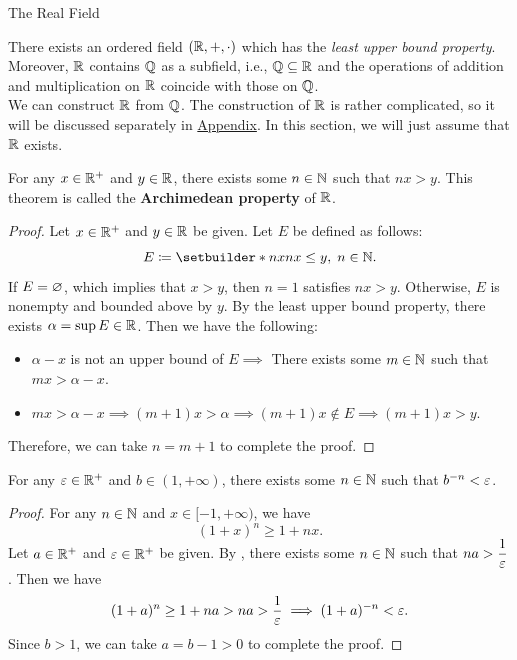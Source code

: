 \begin{section}{The Real Field}

There exists an ordered field $(\mathbb{R}, +, \cdot)$ which has the
\emph{least upper bound property}. Moreover, $\mathbb{R}$ contains $\mathbb{Q}$ as a subfield, i.e.,
$\mathbb{Q} \subseteq \mathbb{R}$ and the operations of addition and multiplication on $\mathbb{R}$ coincide with those on $\mathbb{Q}$.
\\[6mm]
We can construct $\mathbb{R}$ from $\mathbb{Q}$. The construction of $\mathbb{R}$ is rather complicated, so it will be discussed
separately in \hyperref[chap:ConstructionOfR]{Appendix}. In this section, we will just assume that $\mathbb{R}$ exists.

\bigskip

\begin{theorem} \label{thm:ArchimedeanProperty}
    For any $x\in \mathbb{R}^{+}$ and $y \in \mathbb{R}$, there exists some $n \in \mathbb{N}$ such that $nx > y$.
    This theorem is called the \textbf{Archimedean property} of $\mathbb{R}$.
\end{theorem}

\begin{proof}
    Let $x \in \mathbb{R}^{+}$ and $y \in \mathbb{R}$ be given. Let $E$ be defined as follows:
    \[
    E \coloneqq \setbuilder*{nx}{nx \leq y, \; n \in \N}.
    \]
    If $E = \varnothing$, which implies that $x > y$, then $n = 1$ satisfies $nx > y$. Otherwise, $E$ is nonempty and bounded
    above by $y$. By the least upper bound property, there exists $\alpha = \sup E \in \mathbb{R}$. Then we have the following:
    \begin{itemize}
        \item $\alpha - x$ is not an upper bound of $E \implies$ There exists some $m \in \mathbb{N}$ such that $mx > \alpha - x$.
        \item $mx > \alpha - x \implies (m + 1)x > \alpha \implies (m + 1)x \notin E \implies (m + 1)x > y$.
    \end{itemize}
    Therefore, we can take $n = m + 1$ to complete the proof.
\end{proof}

\bigskip

\begin{corollary} \label{cor:ArchimedeanPropertyCorollary}
    For any $\varepsilon \in \mathbb{R}^{+}$ and $b \in (1, + \infty)$, there exists some $n \in \mathbb{N}$ such that $b^{-n} < \varepsilon$.
\end{corollary}

\begin{proof}
    For any $n \in \mathbb{N}$ and $x \in [-1, + \infty)$, we have
    \[
    (1 + x)^{n} \geq 1 + nx.
    \]
    Let $a \in \mathbb{R}^{+}$ and $\varepsilon \in \mathbb{R}^{+}$ be given. By ,
    there exists some $n \in \mathbb{N}$ such that $na > \dfrac{1}{\varepsilon}$. Then we have
    \[
    (1 + a)^{n} \geq 1 + na > na > \frac{1}{\varepsilon} \implies (1 + a)^{-n} < \varepsilon.
    \]
    Since $b > 1$, we can take $a = b - 1 > 0$ to complete the proof.
\end{proof}


\end{section}
